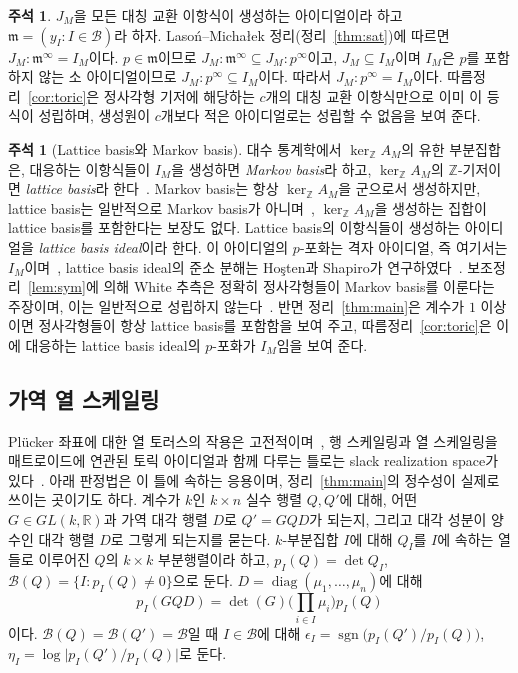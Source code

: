 \documentclass[11pt,a4paper]{article}
\newcommand{\lstroke}{{\lmfont ł}}
\theoremstyle{plain}
\theoremstyle{definition}
\newtheorem{remark}[theorem]{주석}
\newcommand{\R}{\mathbb R}
\newcommand{\Z}{\mathbb Z}
\newcommand{\kerZ}{\ker_{\Z}\!A_M}
\newcommand{\bs}{\mathcal B}
\newcommand{\sgn}{\operatorname{sgn}}
\newcommand{\LM}{Lasoń--Micha\lstroke{}ek}
\begin{document}
\begin{remark}
$J_M$을 모든 대칭 교환 이항식이 생성하는 아이디얼이라 하고 $\mathfrak m=(y_I:I\in\bs)$라 하자. \LM{} 정리(정리~\ref{thm:sat})에 따르면 $J_M:\mathfrak m^\infty=I_M$이다. $p\in\mathfrak m$이므로 $J_M:\mathfrak m^\infty\subseteq J_M:p^\infty$이고, $J_M\subseteq I_M$이며 $I_M$은 $p$를 포함하지 않는 소 아이디얼이므로 $J_M:p^\infty\subseteq I_M$이다. 따라서 $J_M:p^\infty=I_M$이다. 따름정리~\ref{cor:toric}은 정사각형 기저에 해당하는 $c$개의 대칭 교환 이항식만으로 이미 이 등식이 성립하며, 생성원이 $c$개보다 적은 아이디얼로는 성립할 수 없음을 보여 준다.
\end{remark}

\begin{remark}[Lattice basis와 Markov basis]\label{rem:markov}
대수 통계학에서 $\kerZ$의 유한 부분집합은, 대응하는 이항식들이 $I_M$을 생성하면 \emph{Markov basis}라 하고, $\kerZ$의 $\Z$\nobreakdash-기저이면 \emph{lattice basis}라 한다~\cite{DS98}. Markov basis는 항상 $\kerZ$을 군으로서 생성하지만, lattice basis는 일반적으로 Markov basis가 아니며~\cite{DS98}, $\kerZ$을 생성하는 집합이 lattice basis를 포함한다는 보장도 없다. Lattice basis의 이항식들이 생성하는 아이디얼을 \emph{lattice basis ideal}이라 한다. 이 아이디얼의 $p$\nobreakdash-포화는 격자 아이디얼, 즉 여기서는 $I_M$이며~\cite{ES96}, lattice basis ideal의 준소 분해는 Ho{\lmfont ş}ten과 Shapiro가 연구하였다~\cite{HS00}. 보조정리~\ref{lem:sym}에 의해 White 추측은 정확히 정사각형들이 Markov basis를 이룬다는 주장이며, 이는 일반적으로 성립하지 않는다~\cite{Lar26}. 반면 정리~\ref{thm:main}은 계수가 $1$ 이상이면 정사각형들이 항상 lattice basis를 포함함을 보여 주고, 따름정리~\ref{cor:toric}은 이에 대응하는 lattice basis ideal의 $p$\nobreakdash-포화가 $I_M$임을 보여 준다.
\end{remark}

\subsection{가역 열 스케일링}\label{sec:criterion}
Plücker 좌표에 대한 열 토러스의 작용은 고전적이며~\cite{GGMS87,DW91}, 행 스케일링과 열 스케일링을 매트로이드에 연관된 토릭 아이디얼과 함께 다루는 틀로는 slack realization space가 있다~\cite{BW19}. 아래 판정법은 이 틀에 속하는 응용이며, 정리~\ref{thm:main}의 정수성이 실제로 쓰이는 곳이기도 하다. 계수가 $k$인 $k\times n$ 실수 행렬 $Q,Q'$에 대해, 어떤 $G\in GL(k,\R)$과 가역 대각 행렬 $D$로 $Q'=GQD$가 되는지, 그리고 대각 성분이 양수인 대각 행렬 $D$로 그렇게 되는지를 묻는다. $k$\nobreakdash-부분집합 $I$에 대해 $Q_I$를 $I$에 속하는 열들로 이루어진 $Q$의 $k\times k$ 부분행렬이라 하고, $p_I(Q)=\det Q_I$, $\bs(Q)=\{I:p_I(Q)\ne0\}$으로 둔다. $D=\operatorname{diag}(\mu_1,\dots,\mu_n)$에 대해
\begin{equation}\label{eq:plucker}
p_I(GQD)=\det(G)\Big(\prod_{i\in I}\mu_i\Big)p_I(Q)
\end{equation}
이다. $\bs(Q)=\bs(Q')=\bs$일 때 $I\in\bs$에 대해 $\epsilon_I=\sgn\big(p_I(Q')/p_I(Q)\big)$, $\eta_I=\log\big|p_I(Q')/p_I(Q)\big|$로 둔다.
\end{document}
